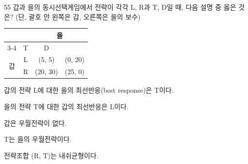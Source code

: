\begin{question}{55}
갑과 을의 동시선택게임에서 전략이 각각 L, R과 T, D일 때, 다음 설명 중 옳은 것은? (단, 괄호 안 왼쪽은 갑, 오른쪽은 을의 보수)
\begin{center}
{\small
\begin{tabular}{|c|c|c|c|}
\hline
\multicolumn{2}{|c|}{} & \multicolumn{2}{c|}{을} \\ \cline{3-4}
\multicolumn{2}{|c|}{} & T & D \\ \hline
\multirow{2}{*}{갑} & L & (5, 5) & (0, 20) \\ \cline{2-4}
 & R & (20, 30) & (25, 0) \\ \hline
\end{tabular}}
\end{center}
\begin{choices}
  \item 갑의 전략 L에 대한 을의 최선반응(best response)은 T이다.
  \item 을의 전략 T에 대한 갑의 최선반응은 L이다.
  \item 갑은 우월전략이 없다.
  \item T는 을의 우월전략이다.
  \item 전략조합 (R, T)는 내쉬균형이다.
\end{choices}
\end{question}

